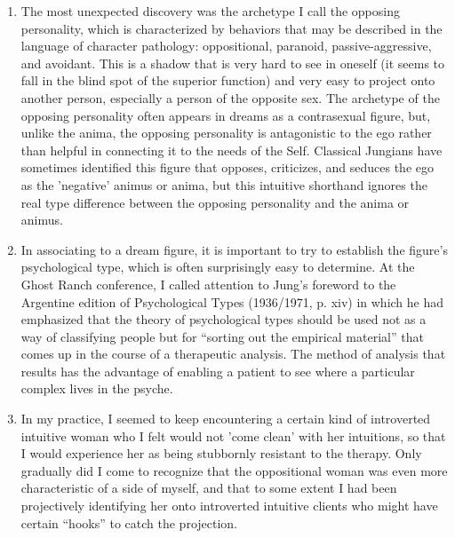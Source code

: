 \begin{enumerate}
    \item {} The most unexpected discovery was the archetype I
        call the opposing personality, which is characterized by behaviors that
        may be described in the language of character pathology: oppositional,
        paranoid, passive-aggressive, and avoidant. This is a shadow that is
        very hard to see in oneself (it seems to fall in the blind spot of the
        superior function) and very easy to project onto another person,
        especially a person of the opposite sex. The archetype of the opposing
        personality often appears in dreams as a contrasexual figure, but,
        unlike the anima, the opposing personality is antagonistic to the ego
        rather than helpful in connecting it to the needs of the Self.
        Classical Jungians have sometimes identified this figure that opposes,
        criticizes, and seduces the ego as the 'negative' animus or anima, but
        this intuitive shorthand ignores the real type difference between the
        opposing personality and the anima or animus.

    \item {} In associating to a dream figure, it is important to try to
        establish the figure's psychological type, which is often surprisingly
        easy to determine. At the Ghost Ranch conference, I called attention to
        Jung's foreword to the Argentine edition of Psychological Types
        (1936/1971, p.  xiv) in which he had emphasized that the theory of
        psychological types should be used not as a way of classifying people
        but for ``sorting out the empirical material'' that comes up in the
        course of a therapeutic analysis. The method of analysis that results
        has the advantage of enabling a patient to see where a particular
        complex lives in the psyche.

    \item {} In my practice, I seemed to keep
        encountering a certain kind of introverted intuitive woman who I felt
        would not 'come clean' with her intuitions, so that I would experience
        her as being stubbornly resistant to the therapy. Only gradually did I
        come to recognize that the oppositional woman was even more
        characteristic of a side of myself, and that to some extent I had been
        projectively identifying her onto introverted intuitive clients who
        might have certain ``hooks'' to catch the projection.


\end{enumerate}
